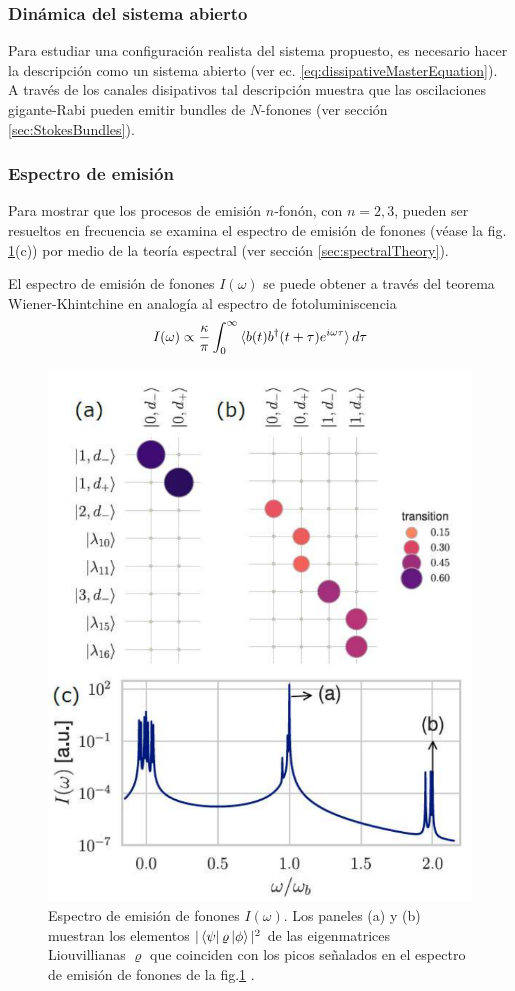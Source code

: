 \documentclass[main.tex]{subfiles}
\begin{document}
\subsubsection{Dinámica del sistema abierto}
Para estudiar una configuración realista del sistema propuesto, es necesario hacer la descripción como un sistema abierto (ver ec. \ref{eq:dissipativeMasterEquation}). A través de los canales disipativos tal descripción muestra que las oscilaciones gigante-Rabi pueden emitir bundles de $N$-fonones (ver sección \ref{sec:StokesBundles}). 

\subsubsection{Espectro de emisión}
Para mostrar que los procesos de emisión $n$-fonón, con $n=2,3$, pueden ser resueltos en frecuencia se examina el espectro de emisión de fonones (véase la fig. \ref{fig:emissionspectrumgiant-rabi}(c)) por medio de la teoría espectral (ver sección \ref{sec:spectralTheory}).

El espectro de emisión de fonones $I(\omega)$ se puede obtener a través del teorema Wiener-Khintchine en analogía al espectro de fotoluminiscencia \parencite{Perea2004}
\begin{equation}
	I(\omega) \propto \frac{\kappa}{\pi} \int_0^\infty \braket{b(t) b^\dagger(t+\tau) e^{i\omega\tau}} d\tau
\end{equation}

\begin{figure}[th]
	\centering
	\includegraphics[width=0.55\linewidth]{img/emissionSpectrum_Giant-Rabi}
	\caption{Espectro de emisión de fonones $I(\omega)$. Los paneles (a) y (b) muestran los elementos $|\bra{\psi}\varrho\ket{\phi}|^2$ de las eigenmatrices Liouvillianas $\varrho$ que coinciden con los picos señalados en el espectro de emisión de fonones de la fig.\ref{fig:emissionspectrumgiant-rabi} \parencite{Vargas2022}.}
	\label{fig:emissionspectrumgiant-rabi}
\end{figure}
\end{document}
